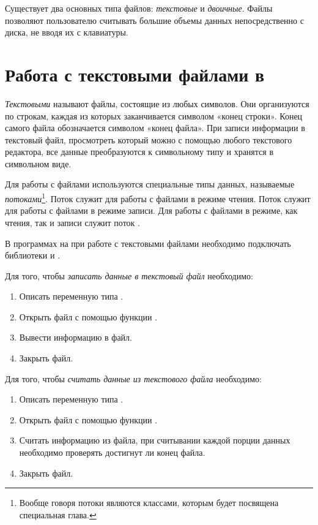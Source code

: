 Существует два основных типа файлов: \emph{текстовые} и \emph{двоичные}. Файлы позволяют
пользователю считывать большие объемы данных непосредственно с диска, не вводя их с клавиатуры.

\section[Работа с текстовыми файлами в \Sys{C++}]{Работа с текстовыми файлами в }\label{ch07:2}
\emph{Текстовыми} называют файлы, состоящие из любых символов. Они организуются по
строкам, каждая из которых заканчивается символом «конец строки». Конец самого файла обозначается символом «конец
файла». При записи информации в текстовый файл, просмотреть который можно с помощью любого текстового редактора, все
данные преобразуются к символьному типу и хранятся в символьном виде.

Для работы с файлами используются специальные типы данных, называемые
\emph{потоками}\footnote{Вообще говоря потоки являются классами, которым будет посвящена
специальная глава.}. Поток  служит для работы с файлами в режиме чтения. Поток
 служит для работы с файлами в режиме записи. Для работы с файлами в режиме, как чтения, так
и записи служит поток .

В программах на  при работе с текстовыми файлами необходимо подключать библиотеки  и
.

Для того, чтобы \emph{записать данные в текстовый файл} необходимо:
\begin{enumerate}
\item Описать переменную типа .
\item Открыть файл с помощью функции .
\item Вывести информацию в файл.
\item Закрыть файл.
\end{enumerate}

Для того, чтобы \emph{считать данные из текстового файла} необходимо:
\begin{enumerate}
\item Описать переменную типа .
\item Открыть файл с помощью функции .
\item Считать информацию из файла, при считывании каждой порции данных необходимо проверять достигнут ли конец файла.
\item Закрыть файл.
\end{enumerate}

